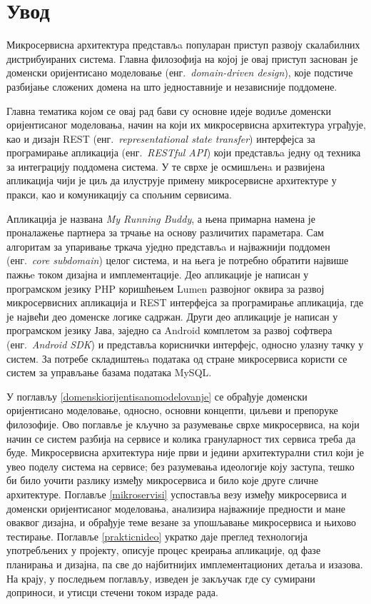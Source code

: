 \documentclass[12pt,oneside]{memoir}
\begin{document}
\frontmatter
\naslovna
\komisija
{}
\apstrakt
\tableofcontents*

\mainmatter

\chapter{Увод}
Микросервисна архитектура представљa популаран приступ развоју скалабилних дистрибуираних система. Главна филозофија на којој је овај приступ заснован је доменски оријентисано моделовање (енг.~\textit{domain-driven design}), које подстиче разбијање сложених домена на што једноставније и независније поддомене.

Главна тематика којом се овај рад бави су основне идеје водиље доменски оријентисаног моделовања, начин на који их микросервисна архитектура уграђује, као и дизајн REST (енг.~\textit{representational state transfer}) интерфејса за програмирање апликација (енг.~\textit{RESTful API}) који представљa једну од техника за интеграцију поддомена система. У те сврхе је осмишљенa и развијена апликација чији је циљ да илуструје примену микросервисне архитектуре у пракси, као и комуникацију са спољним сервисима.

Апликација је названа \textit{My Running Buddy}, а њена примарна намена је проналажење партнера за трчање на основу различитих параметара. Сам алгоритам за упаривање тркача уједно представљa и најважнији поддомен (енг.~\textit{core subdomain}) целог система, и на њега је потребно обратити највише пажњe током дизајна и имплементације. Део апликације је написан у програмском језику PHP коришћењем Lumen развојног оквира за развој микросервисних апликација и REST интерфејса за програмирање апликација, где је највећи део доменске логике садржан. Други део апликације је написан у програмском језику Јава, заједно са Android комплетом за развој софтвера (енг.~\textit{Android SDK}) и представља кориснички интерфејс, односно улазну тачку у систем. За потребе складиштењa података од стране микросервиса користи се систем за управљање базама података MySQL.

У поглављу \ref{domenskiorijentisanomodelovanje} се обрађује доменски оријентисано моделовање, односно, основни концепти, циљеви и препоруке филозофије. Ово поглавље је кључно за разумевање сврхе микросервиса, на који начин се систем разбија на сервисе и колика грануларност тих сервиса треба да буде. Микросервисна архитектура није први и једини архитектурални стил који је увео поделу система на сервисе; без разумевања идеологије коју заступа, тешко би било уочити разлику између микросервиса и било које друге сличне архитектуре. Поглавље \ref{mikroservisi} успоставља везу између микросервиса и доменски оријентисаног моделовања, анализира најважније предности и мане оваквог дизајна, и обрађује теме везане за упошљавање микросервиса и њихово тестирање. Поглавље \ref{prakticnideo} укратко даје преглед технологија употребљених у пројекту, описује процес креирања апликације, од фазе планирања и дизајна, па све до најбитнијих имплементационих детаља и изазова. На крају, у последњем поглављу, изведен је закључак где су сумирани доприноси, и утисци стечени током израде рада.
\end{document}

